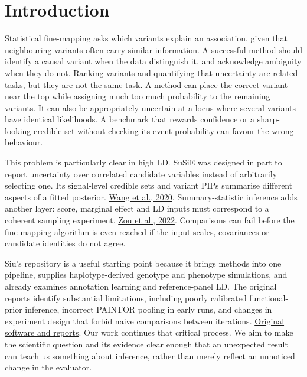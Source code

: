 \documentclass[
  british,
  10pt,
]{article}
\begin{document}
\section{Introduction}\label{introduction}

Statistical fine-mapping asks which variants explain an association,
given that neighbouring variants often carry similar information. A
successful method should identify a causal variant when the data
distinguish it, and acknowledge ambiguity when they do not. Ranking
variants and quantifying that uncertainty are related tasks, but they
are not the same task. A method can place the correct variant near the
top while assigning much too much probability to the remaining variants.
It can also be appropriately uncertain at a locus where several variants
have identical likelihoods. A benchmark that rewards confidence or a
sharp-looking credible set without checking its event probability can
favour the wrong behaviour.

This problem is particularly clear in high LD. SuSiE was designed in
part to report uncertainty over correlated candidate variables instead
of arbitrarily selecting one. Its signal-level credible sets and variant
PIPs summarise different aspects of a fitted posterior.
\href{https://doi.org/10.1111/rssb.12388}{Wang et al., 2020}.
Summary-statistic inference adds another layer: score, marginal effect
and LD inputs must correspond to a coherent sampling experiment.
\href{https://doi.org/10.1371/journal.pgen.1010299}{Zou et al., 2022}.
Comparisons can fail before the fine-mapping algorithm is even reached
if the input scales, covariances or candidate identities do not agree.

Siu's repository is a useful starting point because it brings methods
into one pipeline, supplies haplotype-derived genotype and phenotype
simulations, and already examines annotation learning and
reference-panel LD. The original reports identify substantial
limitations, including poorly calibrated functional-prior inference,
incorrect PAINTOR pooling in early runs, and changes in experiment
design that forbid naive comparisons between iterations.
\href{https://github.com/lucassiu14/fine-mapping-benchmark/tree/f053fdf318a3abe2c44eeb0ac3f3c99a03979b81}{Original
software and reports}. Our work continues that critical process. We aim
to make the scientific question and its evidence clear enough that an
unexpected result can teach us something about inference, rather than
merely reflect an unnoticed change in the evaluator.
\end{document}
